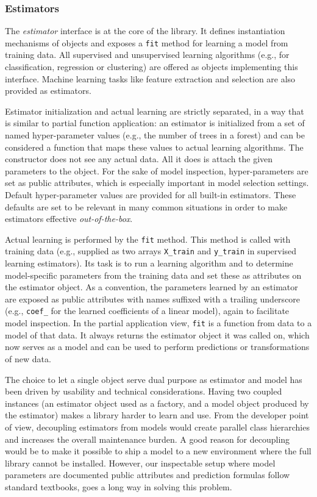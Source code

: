\subsubsection{Estimators}

The \textit{estimator} interface is at the core of the library. It defines
instantiation mechanisms of objects and exposes a \texttt{fit} method for
learning a model from training data.  All supervised and unsupervised learning
algorithms (e.g., for classification, regression or clustering) are offered as
objects implementing this interface. Machine learning tasks like feature
extraction and selection are also provided as estimators.

Estimator initialization and actual learning are strictly separated, in a way
that is similar to partial function application: an estimator is initialized
from a set of named hyper-parameter values (e.g., the number of trees in a
forest) and can be considered a function that maps these values to actual
learning algorithms. The constructor does not see any actual data. All it does
is attach the given parameters to the object. For the sake of model inspection,
hyper-parameters are set as public attributes, which is especially important in
model selection settings. Default hyper-parameter values are provided for all
built-in estimators. These defaults are set to be relevant in many common
situations in order to make estimators effective \textit{out-of-the-box}.

Actual learning is performed by the \texttt{fit} method. This method is called
with training data (e.g., supplied as two arrays \texttt{X\_train} and
\texttt{y\_train} in supervised learning estimators). Its task is to run a
learning algorithm and to determine model-specific parameters from the training
data and set these as attributes on the estimator object. As a convention, the
parameters learned by an estimator are exposed as public attributes with names
suffixed with a trailing underscore (e.g., \texttt{coef\_} for the learned
coefficients of a linear model), again to facilitate model inspection. In the
partial application view, \texttt{fit} is a function from data to a model of
that data. It always returns the estimator object it was called on, which now
serves as a model and can be used to perform predictions or transformations of
new data.

The choice to let a single object serve dual purpose as estimator and model has
been driven by usability and technical considerations. Having two coupled
instances (an estimator object used as a factory, and a model object produced
by the estimator) makes a library harder to learn and use. From the developer
point of view, decoupling estimators from models would create parallel class
hierarchies and increases the overall maintenance burden. A good reason for
decoupling would be to make it possible to ship a model to a new environment
where the full library cannot be installed. However, our inspectable setup
where model parameters are documented public attributes and prediction formulas
follow standard textbooks, goes a long way in solving this problem.

